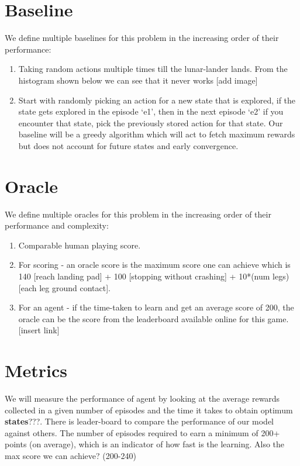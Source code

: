 \documentclass[12pt]{article}
\begin{document}
\section{Baseline}
We define multiple baselines for this problem in the increasing order of their performance:
\begin{enumerate}[label=(\alph*)]
\item Taking random actions multiple times till the lunar-lander lands. From the histogram shown below we can see that it never works [add image]
\item Start with randomly picking an action for a new state that is explored, if the state gets explored in the episode ‘e1’, then in the next episode ‘e2’ if you encounter that state, pick the previously stored action for that state. Our baseline will be a greedy algorithm which will act to  fetch maximum rewards but does not account for future states and early convergence.
\end{enumerate}


\section{Oracle}
We define multiple oracles for this problem in the increasing order of their performance and complexity:
\begin{enumerate}[label=(\alph*)]
\item Comparable human playing score.
\item For scoring - an oracle score is the maximum score one can achieve which is 140 [reach landing pad]  + 100 [stopping without crashing] + 10*(num legs) [each leg ground contact].
\item For an agent - if the time-taken to learn and get an average score of 200, the oracle can be the score from the leaderboard available online for this game. [insert link]
\end{enumerate}

\section{Metrics}
We will measure the performance of agent by looking at the average rewards collected in a given number of episodes and the time it takes to obtain optimum \textbf{states}???. There is leader-board to compare the performance of our model against others. \citep{leaderboard}
\newline
 The number of episodes required to earn a minimum of 200+ points (on average), which is an indicator of how fast is the learning.\newline
Also the max score we can achieve? (200-240)
\end{document}
